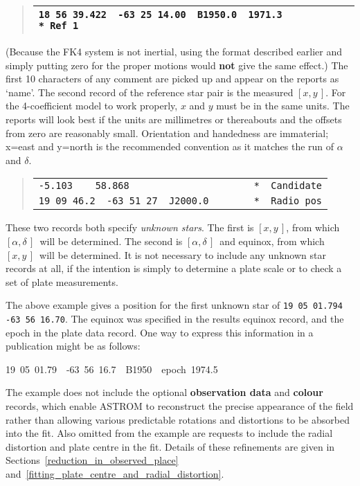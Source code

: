 \documentclass[twoside,11pt]{article}
\renewcommand{\_}{\texttt{\symbol{95}}}
\newcommand{\radec}     {$[\alpha,\delta\,]$}
\newcommand{\xy}        {$[x,y\,]$}
\begin{document}
\begin{quote}
\begin{tabular}{|l|}
\hline
\verb|18 56 39.422  -63 25 14.00  B1950.0  1971.3           * Ref 1| \\
\hline
\end{tabular}
\end{quote}

(Because the FK4 system is not inertial, using the format described
earlier and simply putting zero for the proper motions would \textbf{not}
give the same effect.)  The first 10 characters of any comment are
picked up and appear on the reports as `name'.  The second record of the
reference star pair is the measured \xy.  For the 4-coefficient model to
work properly, $x$ and $y$ must be in the same units.  The reports will
look best if the units are millimetres or thereabouts and the offsets from
zero are reasonably small.  Orientation and handedness are immaterial;
x=east and y=north is the recommended convention as it matches the run
of $\alpha$ and $\delta$.

\goodbreak
\begin{quote}
\begin{tabular}{|l|}
\hline
\verb|-5.103    58.868                      *  Candidate| \\
\verb|19 09 46.2  -63 51 27  J2000.0        *  Radio pos| \\
\hline
\end{tabular}
\end{quote}

These two records both specify \textit{unknown stars}.  The first is \xy,
from which \radec\ will be determined.  The second is \radec\ and equinox,
from which \xy\ will be determined.  It is not necessary to include any
unknown star records at all, if the intention is simply to determine a
plate scale or to check a set of plate measurements.

The above example gives a position for the first unknown star of
\texttt{19 05 01.794 -63 56 16.70}.  The equinox was specified in the
results equinox record, and the epoch in the plate data record.  One way
to express this information in a publication might be as follows:

\begin{center}
19~05~01.79~~-63~56~16.7~~B1950~~epoch~1974.5
\end{center}

The example does not include the optional \textbf{observation data}
and \textbf{colour} records, which enable ASTROM to reconstruct the
precise appearance of the field rather than allowing various predictable
rotations and distortions to be absorbed into the fit.  Also omitted from
the example are requests to include the radial distortion and plate centre
in the fit.  Details of these refinements are given in
Sections~\ref{reduction_in_observed_place}
and~\ref{fitting_plate_centre_and_radial_distortion}.
\end{document}
